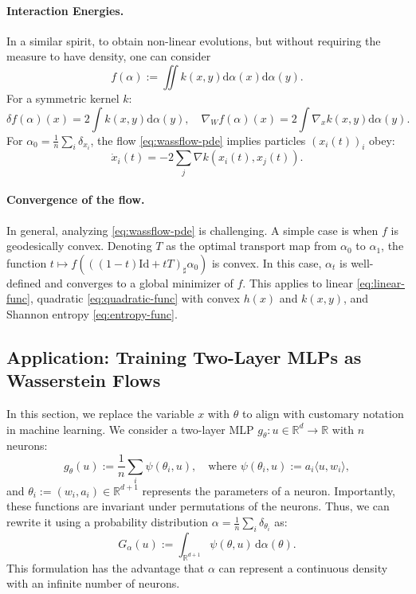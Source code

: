 \paragraph{Interaction Energies.} In a similar spirit, to obtain non-linear evolutions, but without requiring the measure to have density, one can consider
   \begin{equation}
       f(\alpha) := \iint k(x, y) \mathrm{d} \alpha(x) \mathrm{d} \alpha(y). \label{eq:quadratic-func}
   \end{equation}
   For a symmetric kernel $k$:
   \begin{equation*}
       \delta f(\alpha)(x) = 2 \int k(x, y) \mathrm{d} \alpha(y), \quad \nabla_W f(\alpha)(x) = 2 \int \nabla_x k(x, y) \mathrm{d} \alpha(y).
   \end{equation*}
   For $\alpha_0 = \frac{1}{n} \sum_i \delta_{x_i}$, the flow \eqref{eq:wassflow-pde} implies particles $(x_i(t))_i$ obey:
   \begin{equation*}
       \dot{x}_i(t) = -2 \sum_j \nabla k(x_i(t), x_j(t)).
   \end{equation*}
   
\paragraph{Convergence of the flow.}
In general, analyzing \eqref{eq:wassflow-pde} is challenging. A simple case is when $f$ is geodesically convex. Denoting $T$ as the optimal transport map from $\alpha_0$ to $\alpha_1$, the function $t \mapsto f(((1-t)\mathrm{Id} + tT)_\sharp \alpha_0)$ is convex. In this case, $\alpha_t$ is well-defined and converges to a global minimizer of $f$. This applies to linear \eqref{eq:linear-func}, quadratic \eqref{eq:quadratic-func} with convex $h(x)$ and $k(x, y)$, and Shannon entropy \eqref{eq:entropy-func}.


\subsection{Application: Training Two-Layer MLPs as Wasserstein Flows}

In this section, we replace the variable $x$ with $\theta$ to align with customary notation in machine learning. 
%
We consider a two-layer MLP $g_\theta : u \in \mathbb{R}^d \to \mathbb{R}$ with $n$ neurons:
\begin{equation*}
    g_\theta(u) := \frac{1}{n} \sum_i \psi(\theta_i, u), \quad \text{where } \psi(\theta_i, u) := a_i \langle u, w_i \rangle,
\end{equation*}
and $\theta_i := (w_i, a_i) \in \mathbb{R}^{d+1}$ represents the parameters of a neuron. Importantly, these functions are invariant under permutations of the neurons. Thus, we can rewrite it using a probability distribution $\alpha = \frac{1}{n} \sum_i \delta_{\theta_i}$ as:
\begin{equation*}
    G_\alpha(u) := \int_{\mathbb{R}^{d+1}} \psi(\theta, u) \, \mathrm{d} \alpha(\theta).
\end{equation*}
This formulation has the advantage that $\alpha$ can represent a continuous density with an infinite number of neurons.

